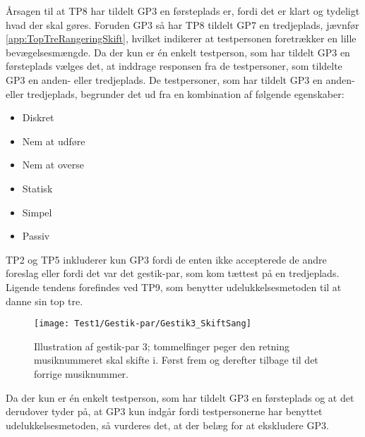 Årsagen til at TP8 har tildelt GP3 en førsteplads er, fordi det er klart og tydeligt hvad der skal gøres. Foruden GP3 så har TP8 tildelt GP7 en tredjeplads, jævnfør \autoref{app:TopTreRangeringSkift}, hvilket indikerer at testpersonen foretrækker en lille bevægelsesmængde. Da der kun er én enkelt testperson, som har tildelt GP3 en førsteplads vælges det, at inddrage responsen fra de testpersoner, som tildelte GP3 en anden- eller tredjeplads. De testpersoner, som har tildelt GP3 en anden- eller tredjeplads, begrunder det ud fra en kombination af følgende egenskaber: 
%
\begin{multicols}{3}
    \begin{itemize}
        \item Diskret
        \item Nem at udføre
        \item Nem at overse
        \item Statisk
        \item Simpel
        \item Passiv
\end{itemize}
\end{multicols}
\noindent
%
TP2 og TP5 inkluderer kun GP3 fordi de enten ikke accepterede de andre foreslag eller fordi det var det gestik-par, som kom tættest på en tredjeplads. Ligende tendens forefindes ved TP9, som benytter udelukkelsesmetoden til at danne sin top tre.
%
\begin{figure}[H]
	\centering
	\texttt{[image: Test1/Gestik-par/Gestik3\_SkiftSang]}
	\caption{Illustration af gestik-par 3; tommelfinger peger den retning musiknummeret skal skifte i. Først frem og derefter tilbage til det forrige musiknummer.}
	\label{fig:GestikPar3Skift}
\end{figure}
\noindent
% 
Da der kun er én enkelt testperson, som har tildelt GP3 en førsteplads og at det derudover tyder på, at GP3 kun indgår fordi testpersonerne har benyttet udelukkelsesmetoden, så vurderes det, at der belæg for at ekskludere GP3.
%
